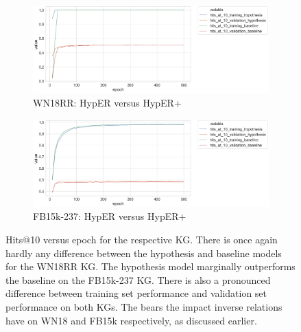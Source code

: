 \begin{figure}[H]
	\begin{subfigure}[b]{.5\linewidth}
   		\centering
    		\includegraphics[width=1.0\linewidth, height=0.5\linewidth]{WN18RR_hits_at_10_Results}
		\captionsetup{justification=centering}
		\caption{WN18RR: HypER versus HypER+}
	\end{subfigure}
	\begin{subfigure}[b]{.5\linewidth}
   		\centering
		\includegraphics[width=1.0\linewidth, height=0.5\linewidth]{FB15k-237_hits_at_10_Results}
		\captionsetup{justification=centering}
		\caption{FB15k-237: HypER versus HypER+}
	\end{subfigure}
	\caption{Hits@10 versus epoch for the respective KG. There is once again hardly any difference between the hypothesis and baseline models for the WN18RR KG. The hypothesis model marginally outperforms the baseline on the FB15k-237 KG. There is also a pronounced difference between training set performance and validation set performance on both KGs. The bears the impact inverse relations have on WN18 and FB15k respectively, as discussed earlier.}
\end{figure}

